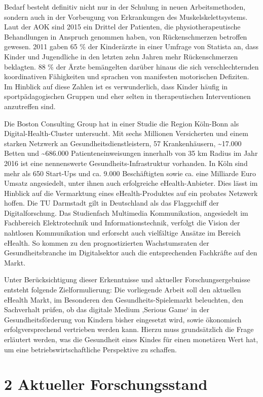 \documentclass[
  a4paper,
  DIV=11,
  numbers=noendperiod,
  onecolumn,
  oneside,
  a4paper]{scrartcl}
\begin{document}
Bedarf besteht definitiv nicht nur in der Schulung in neuen
Arbeitsmethoden, sondern auch in der Vorbeugung von Erkrankungen des
Muskelskelettsystems. Laut der AOK sind 2015 ein Drittel der Patienten,
die physiotherapeutische Behandlungen in Anspruch genommen haben, von
Rückenschmerzen betroffen gewesen. 2011 gaben 65 \% der Kinderärzte in
einer Umfrage von Statista an, dass Kinder und Jugendliche in den
letzten zehn Jahren mehr Rückenschmerzen beklagten. 88 \% der Ärzte
bemängelten darüber hinaus die sich verschlechternden koordinativen
Fähigkeiten und sprachen von manifesten motorischen Defiziten. Im
Hinblick auf diese Zahlen ist es verwunderlich, dass Kinder häufig in
sportpädagogischen Gruppen und eher selten in therapeutischen
Interventionen anzutreffen sind.

Die Boston Consulting Group hat in einer Studie die Region Köln-Bonn als
Digital-Health-Cluster untersucht. Mit sechs Millionen Versicherten und
einem starken Netzwerk an Gesundheitsdienstleistern, 57 Krankenhäusern,
\textasciitilde17.000 Betten und \textasciitilde686.000
Patienteneinweisungen innerhalb von 35 km Radius im Jahr 2016 ist eine
nennenswerte Gesundheits-Infrastruktur vorhanden. In Köln sind mehr als
650 Start-Ups und ca. 9.000 Beschäftigten sowie ca. eine Milliarde Euro
Umsatz angesiedelt, unter ihnen auch erfolgreiche eHealth-Anbieter. Dies
lässt im Hinblick auf die Vermarktung eines eHealth-Produktes auf ein
probates Netzwerk hoffen. Die TU Darmstadt gilt in Deutschland als das
Flaggschiff der Digitalforschung. Das Studienfach Multimedia
Kommunikation, angesiedelt im Fachbereich Elektrotechnik und
Informationstechnik, verfolgt die Vision der nahtlosen Kommunikation und
erforscht auch vielfältige Ansätze im Bereich eHealth. So kommen zu den
prognostizierten Wachstumsraten der Gesundheitsbranche im Digitalsektor
auch die entsprechenden Fachkräfte auf den Markt.

Unter Berücksichtigung dieser Erkenntnisse und aktueller
Forschungsergebnisse entsteht folgende Zielformulierung: Die vorliegende
Arbeit soll den aktuellen eHealth Markt, im Besonderen den
Gesundheits-Spielemarkt beleuchten, den Sachverhalt prüfen, ob das
digitale Medium ‚Serious Game` in der Gesundheitsförderung von Kindern
bisher eingesetzt wird, sowie ökonomisch erfolgversprechend vertrieben
werden kann. Hierzu muss grundsätzlich die Frage erläutert werden, was
die Gesundheit eines Kindes für einen monetären Wert hat, um eine
betriebswirtschaftliche Perspektive zu schaffen.

\section{2 Aktueller Forschungsstand}\label{aktueller-forschungsstand}
\end{document}
